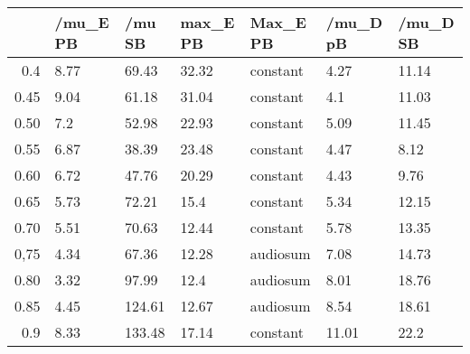 \begin{table}[ht]
\centering
\begin{tabular}{rllllll}
  \hline
 & /mu\_E PB & /mu SB & max\_E PB & Max\_E PB & /mu\_D pB & /mu\_D SB \\ 
  \hline
0.4 & 8.77 & 69.43 & 32.32 & constant & 4.27 & 11.14 \\ 
  0.45 & 9.04 & 61.18 & 31.04 & constant & 4.1 & 11.03 \\ 
  0.50 & 7.2 & 52.98 & 22.93 & constant & 5.09 & 11.45 \\ 
  0.55 & 6.87 & 38.39 & 23.48 & constant & 4.47 & 8.12 \\ 
  0.60 & 6.72 & 47.76 & 20.29 & constant & 4.43 & 9.76 \\ 
  0.65 & 5.73 & 72.21 & 15.4 & constant & 5.34 & 12.15 \\ 
  0.70 & 5.51 & 70.63 & 12.44 & constant & 5.78 & 13.35 \\ 
  0,75 & 4.34 & 67.36 & 12.28 & audiosum & 7.08 & 14.73 \\ 
  0.80 & 3.32 & 97.99 & 12.4 & audiosum & 8.01 & 18.76 \\ 
  0.85 & 4.45 & 124.61 & 12.67 & audiosum & 8.54 & 18.61 \\ 
  0.9 & 8.33 & 133.48 & 17.14 & constant & 11.01 & 22.2 \\ 
   \hline
\end{tabular}
\end{table}
